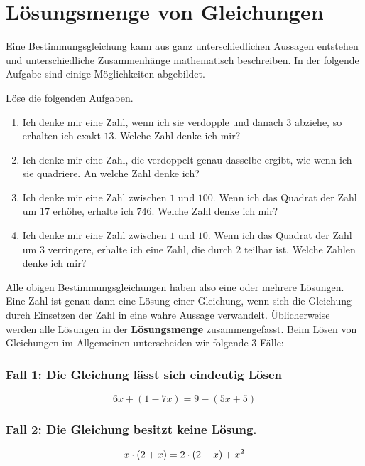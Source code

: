 \documentclass[11pt,oneside]{article}
\begin{document}
\section{Lösungsmenge von Gleichungen}
	Eine Bestimmungsgleichung kann aus ganz unterschiedlichen Aussagen entstehen und unterschiedliche Zusammenhänge mathematisch beschreiben. In der folgende Aufgabe sind einige Möglichkeiten abgebildet.
	\begin{aufgabe}
		Löse die folgenden Aufgaben.
		\begin{enumerate}[label=\alph*)]
			\item \flqq Ich denke mir eine Zahl, wenn ich sie verdopple und danach $3$ abziehe, so erhalten ich exakt $13$. Welche Zahl denke ich mir?\frqq\vspace{1cm}
			\item \flqq Ich denke mir eine Zahl, die verdoppelt genau dasselbe ergibt, wie wenn ich sie quadriere. An welche Zahl denke ich?\frqq\vspace{1cm}
			\item \flqq Ich denke mir eine Zahl zwischen $1$ und $100$. Wenn ich das Quadrat der Zahl um $17$ erhöhe, erhalte ich $746$. Welche Zahl denke ich mir?\frqq\vspace{1cm}
			\item \flqq Ich denke mir eine Zahl zwischen $1$ und $10$. Wenn ich das Quadrat der Zahl um $3$ verringere, erhalte ich eine Zahl, die durch $2$ teilbar ist. Welche Zahlen denke ich mir?\frqq\vspace{1cm}
		\end{enumerate}
	\end{aufgabe}
	Alle obigen Bestimmungsgleichungen haben also eine oder mehrere Lösungen. Eine Zahl ist genau dann eine Lösung einer Gleichung, wenn sich die Gleichung durch Einsetzen der Zahl in eine wahre Aussage verwandelt. Üblicherweise werden alle Lösungen in der \textbf{Lösungsmenge} zusammengefasst. Beim Lösen von Gleichungen im Allgemeinen unterscheiden wir folgende $3$ Fälle:
	\subsubsection*{Fall 1: Die Gleichung lässt sich \textbf{eindeutig} Lösen}
		\[6x+(1-7x)=9-(5x+5)\]
	\subsubsection*{Fall 2: Die Gleichung besitzt \textbf{keine} Lösung.}
		\[x\cdot(2+x)=2\cdot(2+x)+x^2\]
\end{document}
